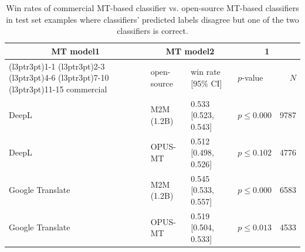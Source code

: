 \begin{table}[!t]

\caption{\label{tab:win_rate_estimates}Win rates of commercial MT-based classifier vs. open-source MT-based classifiers in test set examples where classifiers' predicted labels disagree but one of the two classifiers is correct.}
\centering
\fontsize{10}{12}\selectfont
\begin{tabular}[t]{llllr}
\toprule
\multicolumn{1}{c}{MT model1} & \multicolumn{2}{c}{MT model2} & \multicolumn{3}{c}{ 1} & \multicolumn{4}{c}{ 2} & \multicolumn{5}{c}{ 3} \\
\cmidrule(l{3pt}r{3pt}){1-1} \cmidrule(l{3pt}r{3pt}){2-3} \cmidrule(l{3pt}r{3pt}){4-6} \cmidrule(l{3pt}r{3pt}){7-10} \cmidrule(l{3pt}r{3pt}){11-15}
commercial & open-source & win rate [95\% CI] & $p$-value & $N$\\
\midrule
DeepL & M2M (1.2B) & 0.533 [0.523, 0.543] & $p ≤ 0.000$ & 9787\\
DeepL & OPUS-MT & 0.512 [0.498, 0.526] & $p ≤ 0.102$ & 4776\\
Google Translate & M2M (1.2B) & 0.545 [0.533, 0.557] & $p ≤ 0.000$ & 6583\\
Google Translate & OPUS-MT & 0.519 [0.504, 0.533] & $p ≤ 0.013$ & 4533\\
\bottomrule
\end{tabular}
\end{table}
